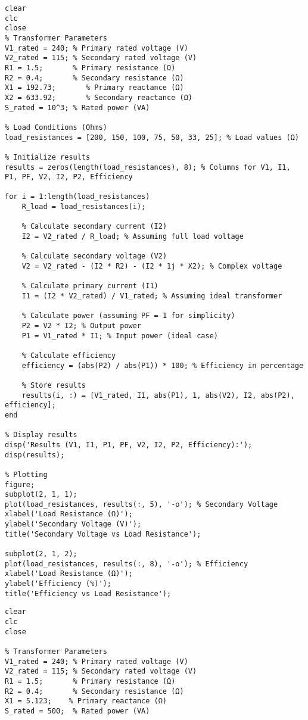\documentclass[11pt]{article}
\begin{document}
\begin{verbatim}
clear
clc
close
% Transformer Parameters
V1_rated = 240; % Primary rated voltage (V)
V2_rated = 115; % Secondary rated voltage (V)
R1 = 1.5;       % Primary resistance (Ω)
R2 = 0.4;       % Secondary resistance (Ω)
X1 = 192.73;       % Primary reactance (Ω)
X2 = 633.92;       % Secondary reactance (Ω)
S_rated = 10^3; % Rated power (VA)

% Load Conditions (Ohms)
load_resistances = [200, 150, 100, 75, 50, 33, 25]; % Load values (Ω)

% Initialize results
results = zeros(length(load_resistances), 8); % Columns for V1, I1, P1, PF, V2, I2, P2, Efficiency

for i = 1:length(load_resistances)
    R_load = load_resistances(i);

    % Calculate secondary current (I2)
    I2 = V2_rated / R_load; % Assuming full load voltage

    % Calculate secondary voltage (V2)
    V2 = V2_rated - (I2 * R2) - (I2 * 1j * X2); % Complex voltage

    % Calculate primary current (I1)
    I1 = (I2 * V2_rated) / V1_rated; % Assuming ideal transformer

    % Calculate power (assuming PF = 1 for simplicity)
    P2 = V2 * I2; % Output power
    P1 = V1_rated * I1; % Input power (ideal case)

    % Calculate efficiency
    efficiency = (abs(P2) / abs(P1)) * 100; % Efficiency in percentage

    % Store results
    results(i, :) = [V1_rated, I1, abs(P1), 1, abs(V2), I2, abs(P2), efficiency];
end

% Display results
disp('Results (V1, I1, P1, PF, V2, I2, P2, Efficiency):');
disp(results);

% Plotting
figure;
subplot(2, 1, 1);
plot(load_resistances, results(:, 5), '-o'); % Secondary Voltage
xlabel('Load Resistance (Ω)');
ylabel('Secondary Voltage (V)');
title('Secondary Voltage vs Load Resistance');

subplot(2, 1, 2);
plot(load_resistances, results(:, 8), '-o'); % Efficiency
xlabel('Load Resistance (Ω)');
ylabel('Efficiency (%)');
title('Efficiency vs Load Resistance');

\end{verbatim}

\begin{verbatim}
clear
clc
close

% Transformer Parameters
V1_rated = 240; % Primary rated voltage (V)
V2_rated = 115; % Secondary rated voltage (V)
R1 = 1.5;       % Primary resistance (Ω)
R2 = 0.4;       % Secondary resistance (Ω)
X1 = 5.123;    % Primary reactance (Ω)
S_rated = 500;  % Rated power (VA)


\end{verbatim}
\end{document}

